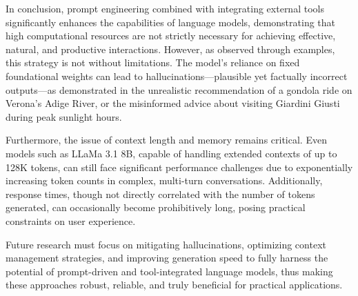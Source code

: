 In conclusion, prompt engineering combined with integrating external tools significantly enhances the capabilities of language models, demonstrating that high computational resources are not strictly necessary for achieving effective, natural, and productive interactions. However, as observed through examples, this strategy is not without limitations. The model's reliance on fixed foundational weights can lead to hallucinations—plausible yet factually incorrect outputs—as demonstrated in the unrealistic recommendation of a gondola ride on Verona's Adige River, or the misinformed advice about visiting Giardini Giusti during peak sunlight hours.

Furthermore, the issue of context length and memory remains critical. Even models such as LLaMa 3.1 8B, capable of handling extended contexts of up to 128K tokens, can still face significant performance challenges due to exponentially increasing token counts in complex, multi-turn conversations. Additionally, response times, though not directly correlated with the number of tokens generated, can occasionally become prohibitively long, posing practical constraints on user experience.

Future research must focus on mitigating hallucinations, optimizing context management strategies, and improving generation speed to fully harness the potential of prompt-driven and tool-integrated language models, thus making these approaches robust, reliable, and truly beneficial for practical applications.